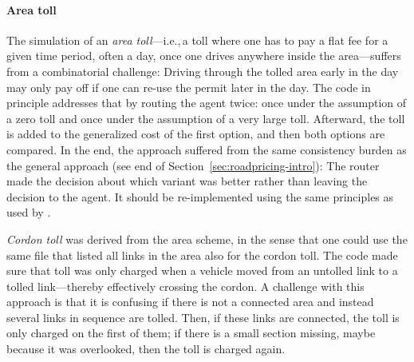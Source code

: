 \paragraph{Area toll} The simulation of an \emph{area toll}---i.e.,\,a toll where one has to pay a flat fee for a given time period, often a day, once one drives anywhere inside the area---suffers from a combinatorial challenge: Driving through the tolled area early in the day may only pay off if one can re-use the permit later in the day. The code in principle addresses that by routing the agent twice: once under the assumption of a zero toll and once under the assumption of a very large toll. Afterward, the toll is added to the generalized cost of the first option, and then both options are compared.  
%
In the end, the approach suffered from the same consistency burden as the general approach (see end of Section~\ref{sec:roadpricing-intro}): The router made the decision about which variant was better rather than leaving the decision to the agent. It should be re-implemented using the same principles as used by \citet{NagelKickhoeferJoubert2014HeterogeneousVoTsPROCEDIA}.

\emph{Cordon toll} was derived from the area scheme, in the sense that one could use the same file that listed all links in the area also for the cordon toll. The code made sure that toll was only charged when a vehicle moved from an untolled link to a tolled link---thereby effectively crossing the cordon. A challenge with this approach is that it is confusing if there is not a connected area and instead several links in sequence are tolled.  Then, if these links are connected, the toll is only charged on the first of them; if there is a small section missing, maybe because it was overlooked, then the toll is charged again. 



	
